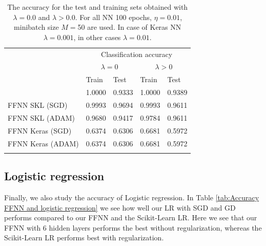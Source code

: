 \documentclass{emulateapj}
\begin{document}
\begin{table}[!htb]
\begin{center}
\caption{\scriptsize The accuracy for the test and training sets obtained with $\lambda=0.0$ and $\lambda>0.0$. For all NN 100 epochs, $\eta=0.01$, minibatch size $M=$50 are used. In case of Keras NN $\lambda=0.001$, in other cases $\lambda=0.01$.}
\label{tab:Accuracy for FFNN with Keras}  
\begin{tabular}{lllll}
\cline{2-5}
\noalign{\smallskip}
& \multicolumn{4}{c}{Classification accuracy}\\
\cline{2-5}\noalign{\smallskip}
& \multicolumn{2}{c}{$\lambda = 0$} & \multicolumn{2}{c}{$\lambda > 0$}\\ \cline{2-5}\noalign{\smallskip} 
& Train & Test & Train & Test \\ \hline\noalign{\smallskip}
\multicolumn{1}{l|}{FFNN} & 1.0000 & 0.9333 & 1.0000 & 0.9389\\
\multicolumn{1}{l|}{FFNN SKL (SGD)} & 0.9993 & 0.9694 & 0.9993 & 0.9611\\
\multicolumn{1}{l|}{FFNN SKL (ADAM)} & 0.9680 & 0.9417 & 0.9784 & 0.9611\\
\multicolumn{1}{l|}{FFNN Keras (SGD)} & 0.6374 & 0.6306 & 0.6681 & 0.5972\\
\multicolumn{1}{l|}{FFNN Keras (ADAM)} & 0.6374 & 0.6306 & 0.6681 & 0.5972\\
 \noalign{\smallskip}\hline
\end{tabular}
\end{center}
\end{table}

\subsection{Logistic regression}
\label{subsec:logistic regression results}

Finally, we also study the accuracy of Logistic regression. In Table \ref{tab:Accuracy FFNN and logistic regression} we see how well our LR with SGD and GD performs compared to our FFNN and the Scikit-Learn LR. Here we see that our FFNN with 6 hidden layers performs the best without regularization, whereas the Scikit-Learn LR performs best with regularization. 
\end{document}
